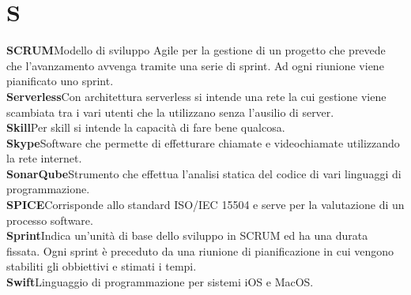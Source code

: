 \newpage
\section{S}\label{l:S}

\textbf{SCRUM}\newline Modello di sviluppo Agile per la gestione di un progetto che prevede che l'avanzamento avvenga tramite una serie di sprint. Ad ogni riunione viene pianificato uno sprint.\\
\newline
\textbf{Serverless}\newline Con architettura serverless si intende una rete la cui gestione viene scambiata tra i vari utenti che la utilizzano senza l'ausilio di server.\\
\newline
\textbf{Skill}\newline Per skill si intende la capacità di fare bene qualcosa.\\
\newline
\textbf{Skype}\newline Software che permette di effetturare chiamate e videochiamate utilizzando la rete internet.\\
\newline
\textbf{SonarQube}\newline Strumento che effettua l'analisi statica del codice di vari linguaggi di programmazione.\\
\newline
\textbf{SPICE}\newline Corrisponde allo standard ISO/IEC 15504 e serve per la valutazione di un processo software.\\
\newline
\textbf{Sprint}\newline Indica un'unità di base dello sviluppo in SCRUM ed ha una durata fissata. Ogni sprint è preceduto da una riunione di pianificazione in cui vengono stabiliti gli obbiettivi e stimati i tempi.\\
\newline
\textbf{Swift}\newline Linguaggio di programmazione per sistemi iOS e MacOS.